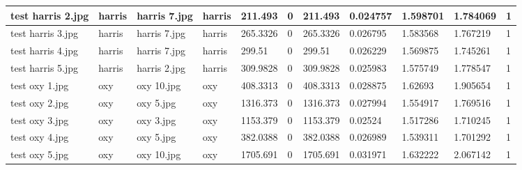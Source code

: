 \begin{landscape}
\begin{longtable}{|p{2cm}|p{1.5cm}|p{2cm}|p{1.5cm}|p{2cm}|p{1cm}|p{2cm}|p{2cm}|p{2cm}|p{2cm}|p{1cm}|}
		test harris 2.jpg    & harris           & harris 7.jpg          & harris                      & 211.493               & 0                       & 211.493                    & 0.024757              & 1.598701              & 1.784069                 & 1                \\ \hline
		test harris 3.jpg    & harris           & harris 7.jpg          & harris                      & 265.3326              & 0                       & 265.3326                   & 0.026795              & 1.583568              & 1.767219                 & 1                \\ \hline
		test harris 4.jpg    & harris           & harris 7.jpg          & harris                      & 299.51                & 0                       & 299.51                     & 0.026229              & 1.569875              & 1.745261                 & 1                \\ \hline
		test harris 5.jpg    & harris           & harris 2.jpg          & harris                      & 309.9828              & 0                       & 309.9828                   & 0.025983              & 1.575749              & 1.778547                 & 1                \\ \hline
		test oxy 1.jpg       & oxy              & oxy 10.jpg            & oxy                         & 408.3313              & 0                       & 408.3313                   & 0.028875              & 1.62693               & 1.905654                 & 1                \\ \hline
		test oxy 2.jpg       & oxy              & oxy 5.jpg             & oxy                         & 1316.373              & 0                       & 1316.373                   & 0.027994              & 1.554917              & 1.769516                 & 1                \\ \hline
		test oxy 3.jpg       & oxy              & oxy 3.jpg             & oxy                         & 1153.379              & 0                       & 1153.379                   & 0.02524               & 1.517286              & 1.710245                 & 1                \\ \hline
		test oxy 4.jpg       & oxy              & oxy 5.jpg             & oxy                         & 382.0388              & 0                       & 382.0388                   & 0.026989              & 1.539311              & 1.701292                 & 1                \\ \hline
		test oxy 5.jpg       & oxy              & oxy 10.jpg            & oxy                         & 1705.691              & 0                       & 1705.691                   & 0.031971              & 1.632222              & 2.067142                 & 1                \\ \hline

\end{longtable}
\end{landscape}
